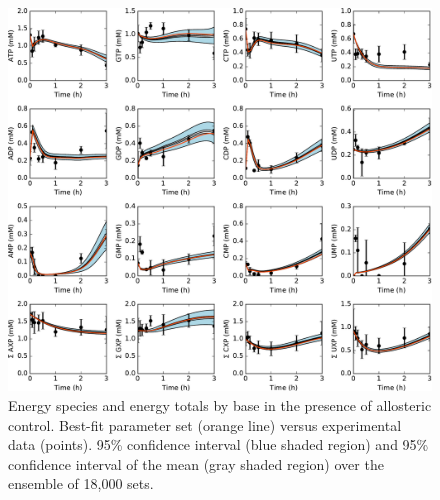 \documentclass[12pt]{article}
\begin{document}
\begin{figure}[ht]
\centering
\includegraphics[width=1.00\textwidth]{./Figures/Energy.pdf}
\caption{Energy species and energy totals by base in the presence of allosteric control. Best-fit parameter set (orange line) versus experimental data (points). 95\% confidence interval (blue shaded region) and 95\% confidence interval of the mean (gray shaded region) over the ensemble of 18,000 sets.}
\label{fig:Energy}
\end{figure}
\end{document}
